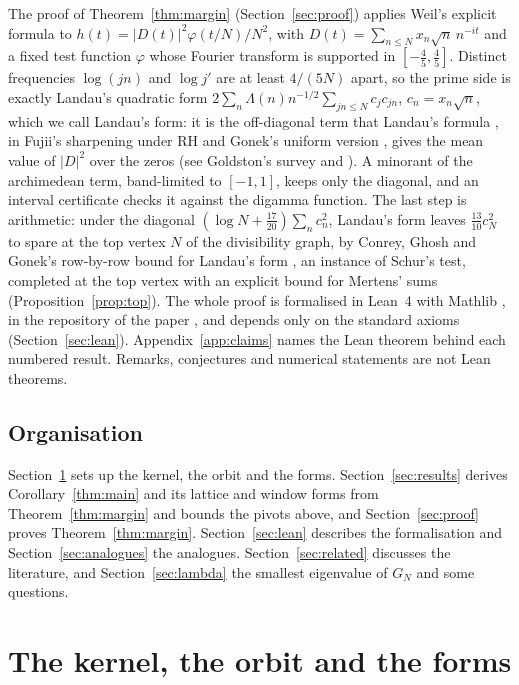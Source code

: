 \documentclass[11pt]{article}
\theoremstyle{definition}
\begin{document}
The proof of Theorem~\ref{thm:margin} (Section~\ref{sec:proof}) applies Weil's explicit formula to $h(t) = |D(t)|^2
\varphi(t/N)/N^2$, with $D(t) = \sum_{n \le N} x_n \sqrt n\, n^{-it}$ and a fixed test function $\varphi$ whose Fourier
transform is supported in $[-\tfrac45, \tfrac45]$. Distinct frequencies $\log(jn)$ and $\log j'$ are at least $4/(5N)$
apart, so the prime side is exactly Landau's quadratic form $2\sum_n \Lambda(n) n^{-1/2} \sum_{jn \le N} c_j c_{jn}$,
$c_n = x_n \sqrt n$, which we call Landau's form: it is the off-diagonal term that Landau's formula \cite{landau12}, in
Fujii's sharpening under RH \cite{fujii89} and Gonek's uniform version \cite{gonek93}, gives the mean value of $|D|^2$
over the zeros (see Goldston's survey \cite[Section~3]{goldston05} and \cite[Theorem~3.1]{bfm24}). A minorant of the
archimedean term, band-limited to $[-1,
1]$, keeps only the diagonal, and an interval certificate checks it against the digamma function. The last step is
arithmetic: under the diagonal $(\log N + \frac{17}{20})\sum_n
c_n^2$, Landau's form leaves $\frac{13}{10}c_N^2$ to spare
at the top vertex $N$ of the divisibility graph, by Conrey, Ghosh and Gonek's row-by-row bound for Landau's form
\cite{cgg84}, an instance of Schur's test, completed at the top vertex with an explicit bound for Mertens' sums
(Proposition~\ref{prop:top}). The whole proof is formalised in Lean~4 \cite{lean4} with Mathlib \cite{mathlib}, in the
repository of the paper \cite{repo}, and depends only on the standard axioms (Section~\ref{sec:lean}).
Appendix~\ref{app:claims} names the Lean theorem behind each numbered result. Remarks, conjectures and numerical
statements are not Lean theorems.

\subsection*{Organisation}

Section~\ref{sec:setup} sets up the kernel, the orbit and the forms. Section~\ref{sec:results} derives
Corollary~\ref{thm:main} and its lattice and window forms from Theorem~\ref{thm:margin} and bounds the pivots above, and
Section~\ref{sec:proof} proves Theorem~\ref{thm:margin}. Section~\ref{sec:lean}
describes the formalisation and Section~\ref{sec:analogues} the analogues. Section~\ref{sec:related} discusses the
literature, and Section~\ref{sec:lambda} the smallest eigenvalue of $G_N$ and some questions.

\section{The kernel, the orbit and the forms}\label{sec:setup}
\end{document}
